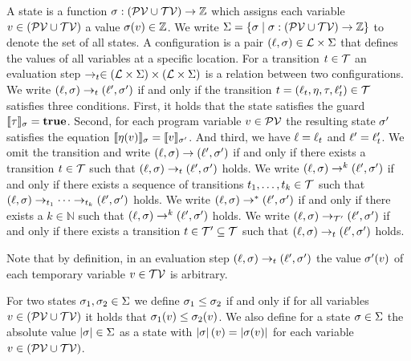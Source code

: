 \begin{definition}[Evaluation] 
  A state is a function $\sigma: (\mathcal{PV} \cup \mathcal{TV}) \rightarrow \mathbb{Z}$ which assigns each variable $v \in (\mathcal{PV} \cup \mathcal{TV})$ a value $\sigma(v) \in \mathbb{Z}$.
  We write $\Sigma = \lbrace  \sigma \mid \sigma: (\mathcal{PV} \cup \mathcal{TV}) \rightarrow \mathbb{Z} \rbrace$ to denote the set of all states.
  A configuration is a pair $(\ell, \sigma) \in \mathcal{L} \times \Sigma$ that defines the values of all variables at a specific location.
  For a transition $t \in \mathcal{T}$ an evaluation step $\rightarrow_t \in (\mathcal{L} \times \Sigma) \times (\mathcal{L} \times \Sigma)$ is a relation between two configurations.
  We write $(\ell, \sigma) \rightarrow_t (\ell', \sigma')$ if and only if the transition $t = (\ell_t, \eta, \tau, \ell_t') \in \mathcal{T}$ satisfies three conditions.
  First, it holds that the state satisfies the guard $\llbracket \tau \rrbracket_{\sigma} = \textbf{true}$.
  Second, for each program variable $v \in \mathcal{PV}$ the resulting state $\sigma'$ satisfies the equation $\llbracket \eta(v) \rrbracket_{\sigma} = \llbracket v \rrbracket_{\sigma'}$.
  And third, we have $\ell = \ell_t$ and $\ell' = \ell_t'$.
  We omit the transition and write $(\ell, \sigma) \rightarrow (\ell', \sigma')$ if and only if there exists a transition $t \in \mathcal{T}$ such that $(\ell, \sigma) \rightarrow_t (\ell', \sigma')$ holds.
  We write $(\ell, \sigma) \rightarrow^k (\ell', \sigma')$ if and only if there exists a sequence of transitions $t_1, \dots, t_k \in \mathcal{T}$ such that $(\ell, \sigma) \rightarrow_{t_1} \dots \rightarrow_{t_k} (\ell', \sigma')$ holds.
  We write $(\ell, \sigma) \rightarrow^* (\ell', \sigma')$ if and only if there exists a $k \in \mathbb{N}$ such that $(\ell, \sigma) \rightarrow^k (\ell', \sigma')$ holds.
  We write $(\ell, \sigma) \rightarrow_{\mathcal{T}'} (\ell', \sigma')$ if and only if there exists a transition $t \in \mathcal{T}' \subseteq \mathcal{T}$ such that $(\ell, \sigma) \rightarrow_t (\ell', \sigma')$ holds.
\end{definition}

Note that by definition, in an evaluation step $(\ell, \sigma) \rightarrow_t (\ell', \sigma')$ the value $\sigma'(v)$ of each temporary variable $v \in \mathcal{TV}$ is arbitrary.

For two states $\sigma_1, \sigma_2 \in \Sigma$ we define $\sigma_1 \leq \sigma_2$ if and only if for all variables $v \in (\mathcal{PV} \cup \mathcal{TV})$ it holds that $\sigma_1(v) \leq \sigma_2(v)$.
We also define for a state $\sigma \in \Sigma$ the absolute value $\left|\sigma\right| \in \Sigma$ as a state with $\left|\sigma\right|(v) = \left|\sigma(v)\right|$ for each variable $v \in (\mathcal{PV} \cup \mathcal{TV})$.

